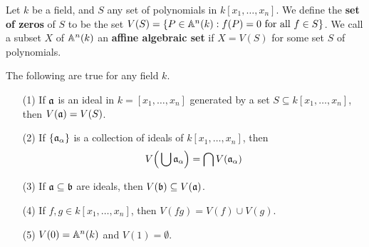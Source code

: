 \begin{definition}
    Let $k$ be a field, and $S$ any set of polynomials in $k[x_1, \dots, x_n]$.
    We define the \textbf{set of zeros} of $S$ to be the set  $V(S)=\{P \in
    \mathbb{A}^n(k) : f(P)=0 \text{ for all } f \in S\}$. We call a subset $X$ of
    $\mathbb{A}^n(k)$ an \textbf{affine algebraic set} if $X=V(S)$ for some set $S$ of
    polynomials.
\end{definition}

\begin{lemma}\label{1.2.1}
    The following are true for any field $k$.
    \begin{enumerate}
        \item[(1)] If $\mathfrak{a}$ is an ideal in $k=[x_1, \dots, x_n]$ generated by a
            set $S \subseteq k[x_1, \dots, x_n]$, then $V(\mathfrak{a})=V(S)$.

        \item[(2)] If $\{\mathfrak{a}_\alpha\}$ is a collection of ideals of $k[x_1, \dots,
            x_n]$, then
            \begin{equation*}
                V\Big{(} \bigcup{\mathfrak{a}_\alpha} \Big{)}=\bigcap{V(\mathfrak{a}_\alpha)}
            \end{equation*}

        \item[(3)] If $\mathfrak{a} \subseteq \mathfrak{b}$ are ideals, then  $V(\mathfrak{b}) \subseteq
            V(\mathfrak{a})$.

        \item[(4)] If $f,g \in k[x_1, \dots, x_n]$, then $V(fg)=V(f) \cup V(g)$.

        \item[(5)] $V(0)=\mathbb{A}^n(k)$ and $V(1)=\emptyset$.
    \end{enumerate}
\end{lemma}
